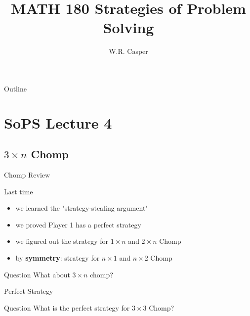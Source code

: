 \documentclass{beamer}
\title{MATH 180 Strategies of Problem Solving}
\subtitle
{} %
\author[W.R. Casper] %
{W.R. Casper}
\institute[California State University Fullerton] %
{
  Department of Mathematics\\
  California State University Fullerton}
\begin{document}
\begin{frame}
  \titlepage
\end{frame}

\begin{frame}{Outline}
  \tableofcontents
\end{frame}



\section{SoPS Lecture 4}
\subsection{$3\times n$ Chomp}


\begin{frame}{Chomp Review}
  \begin{block}{Last time}
    \begin{itemize}
\pause
      \item we learned the "strategy-stealing argument"
\pause
      \item we proved {\color{blue}Player 1} has a perfect strategy
\pause
      \item we figured out the strategy for $1\times n$ and $2\times n$ Chomp
\pause
      \item by \textbf{symmetry}: strategy for $n\times 1$ and $n\times 2$ Chomp
    \end{itemize}
  \end{block}
\pause
  \begin{block}{Question}
    What about $3\times n$ chomp?
  \end{block}
\end{frame}

\begin{frame}{Perfect Strategy}
\pause
  \begin{block}{Question}
    What is the perfect strategy for $3\times 3$ Chomp?
    \begin{center}
    \end{center}
  \end{block}
\end{frame}
\end{document}
